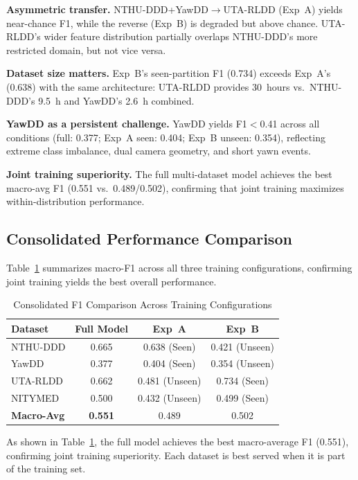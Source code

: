 \documentclass[journal]{IEEEtran}
\begin{document}
\textbf{Asymmetric transfer.} NTHU-DDD+YawDD$\rightarrow$UTA-RLDD (Exp~A) yields near-chance F1, while the reverse (Exp~B) is degraded but above chance. UTA-RLDD's wider feature distribution partially overlaps NTHU-DDD's more restricted domain, but not vice versa.

\textbf{Dataset size matters.} Exp~B's seen-partition F1 (0.734) exceeds Exp~A's (0.638) with the same architecture: UTA-RLDD provides 30~hours vs.\ NTHU-DDD's 9.5~h and YawDD's 2.6~h combined.

\textbf{YawDD as a persistent challenge.} YawDD yields F1$<$0.41 across all conditions (full: 0.377; Exp~A seen: 0.404; Exp~B unseen: 0.354), reflecting extreme class imbalance, dual camera geometry, and short yawn events.

\textbf{Joint training superiority.} The full multi-dataset model achieves the best macro-avg F1 (0.551 vs.\ 0.489/0.502), confirming that joint training maximizes within-distribution performance.

\subsection{Consolidated Performance Comparison}
\label{sec:consolidated}
Table~\ref{tab:consolidated} summarizes macro-F1 across all three training configurations, confirming joint training yields the best overall performance.

\begin{table}[t]
  \caption{Consolidated F1 Comparison Across Training Configurations}
  \label{tab:consolidated}
  \centering
  \small
  \setlength{\tabcolsep}{3pt}
  \begin{tabular}{lccc}
    \toprule
    Dataset & Full Model & Exp~A & Exp~B \\
    \midrule
    NTHU-DDD & 0.665 & 0.638 (Seen) & 0.421 (Unseen) \\
    YawDD    & 0.377 & 0.404 (Seen) & 0.354 (Unseen) \\
    UTA-RLDD & 0.662 & 0.481 (Unseen) & 0.734 (Seen) \\
    NITYMED  & 0.500 & 0.432 (Unseen) & 0.499 (Seen) \\
    \midrule
    \textbf{Macro-Avg} & \textbf{0.551} & 0.489 & 0.502 \\
    \bottomrule
  \end{tabular}
\end{table}

As shown in Table~\ref{tab:consolidated}, the full model achieves the best macro-average F1 (0.551), confirming joint training superiority. Each dataset is best served when it is part of the training set.
\end{document}

